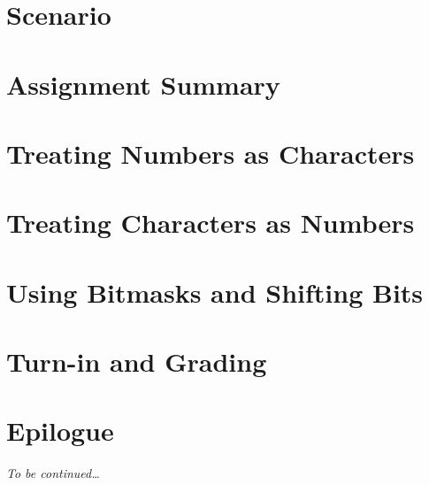 \documentclass[12pt]{article}
\begin{document}
    \labidentifier


    \softwareengineeringfrontmatter

    \section*{Scenario}                                                         \scenariointroduction

    \section{Assignment Summary}                                                

    \section{Treating Numbers as Characters} \label{sec:asciiTable}             

    \section{Treating Characters as Numbers} \label{sec:charactersAsNumbers}    

    \section{Using Bitmasks and Shifting Bits} \label{sec:bitOps}               

    \section{Turn-in and Grading}                                               

    \section*{Epilogue}                                                         \scenariowrapup

    \textit{To be continued\dots}
\end{document}
